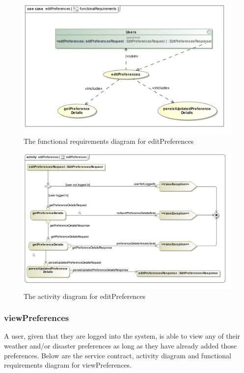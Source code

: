 \begin{figure}[H]
	\centering
	\includegraphics[width=1.1\textwidth]{../images/funcReq/editPreferencesFunctionalRequirements.jpg}
	\caption{The functional requirements diagram for editPreferences \label{overflow}}
\end{figure}

\begin{figure}[H]
	\centering
	\includegraphics[scale=0.21]{../images/funcReq/editPreferencesActivityDiagram.jpg}
	\caption{The activity diagram for editPreferences \label{overflow}}
\end{figure}

\subsubsection{viewPreferences}

A user, given that they are logged into the system, is able to view any of their weather and/or disaster preferences as long as they have already added those preferences. Below are the service contract, activity diagram and functional requirements diagram for viewPreferences.

